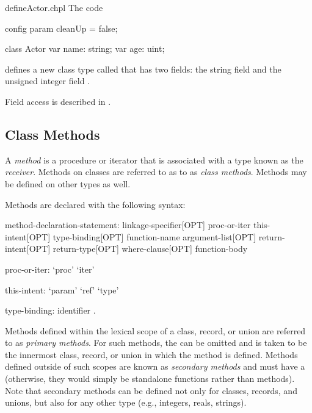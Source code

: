 \begin{chapelexample}{defineActor.chpl}
The code
\begin{chapelpre}
config param cleanUp = false;
\end{chapelpre}
\begin{chapel}
class Actor {
  var name: string;
  var age: uint;
}
\end{chapel}
\begin{chapeloutput}
\end{chapeloutput}
defines a new class type called  that has two fields: the
string field  and the unsigned integer field .
\end{chapelexample}

Field access is described in .

\subsection{Class Methods}
\label{Class_Methods}

A \emph{method} is a procedure or iterator that is associated with a
type known as the \emph{receiver}.  Methods on classes are referred
to as to as \emph{class methods}.  Methods may be defined on other
types as well.

Methods are declared with the following syntax:
\begin{syntax}
method-declaration-statement:
  linkage-specifier[OPT] proc-or-iter this-intent[OPT] type-binding[OPT] function-name argument-list[OPT] 
    return-intent[OPT] return-type[OPT] where-clause[OPT] function-body

proc-or-iter:
  `proc'
  `iter'

this-intent:
  `param'
  `ref'
  `type'

type-binding:
  identifier .
\end{syntax}
Methods defined within the lexical scope of a class, record, or union
are referred to as \emph{primary methods}.  For such methods,
the  can be omitted and is taken to be the
innermost class, record, or union in which the method is defined.
Methods defined outside of such scopes are known as \emph{secondary
methods} and must have a  (otherwise, they would
simply be standalone functions rather than methods).  Note that
secondary methods can be defined not only for classes, records, and
unions, but also for any other type (e.g., integers, reals, strings).


